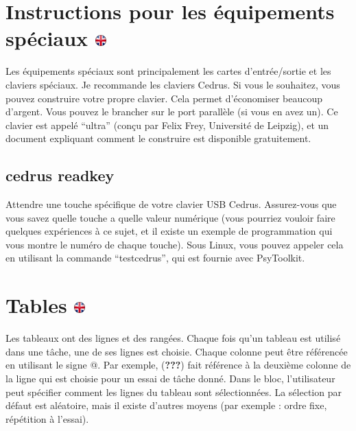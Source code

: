 \documentclass[
]{book}
\begin{document}
\hypertarget{instructions-pour-les-uxe9quipements-spuxe9ciaux}{%
\section[Instructions pour les équipements spéciaux
]{\texorpdfstring{Instructions pour les équipements spéciaux
\href{https://www.psytoolkit.org/doc3.2.0/syntax.html\#_instructions_for_special_equipment}{\protect\includegraphics{img/ukflag.png}}}{Instructions pour les équipements spéciaux }}\label{instructions-pour-les-uxe9quipements-spuxe9ciaux}}

Les équipements spéciaux sont principalement les cartes d'entrée/sortie
et les claviers spéciaux. Je recommande les claviers Cedrus. Si vous le
souhaitez, vous pouvez construire votre propre clavier. Cela permet
d'économiser beaucoup d'argent. Vous pouvez le brancher sur le port
parallèle (si vous en avez un). Ce clavier est appelé ``ultra'' (conçu
par Felix Frey, Université de Leipzig), et un document expliquant
comment le construire est disponible gratuitement.

\hypertarget{cedrusreadkey}{%
\subsection{cedrus readkey}\label{cedrusreadkey}}

Attendre une touche spécifique de votre clavier USB Cedrus. Assurez-vous
que vous savez quelle touche a quelle valeur numérique (vous pourriez
vouloir faire quelques expériences à ce sujet, et il existe un exemple
de programmation qui vous montre le numéro de chaque touche). Sous
Linux, vous pouvez appeler cela en utilisant la commande ``testcedrus'',
qui est fournie avec PsyToolkit.

\hypertarget{tables}{%
\section[Tables ]{\texorpdfstring{Tables
\href{https://www.psytoolkit.org/doc3.2.0/syntax.html\#table}{\protect\includegraphics{img/ukflag.png}}}{Tables }}\label{tables}}

Les tableaux ont des lignes et des rangées. Chaque fois qu'un tableau
est utilisé dans une tâche, une de ses lignes est choisie. Chaque
colonne peut être référencée en utilisant le signe @. Par exemple,
({\textbf{???}}) fait référence à la deuxième colonne de la ligne qui
est choisie pour un essai de tâche donné. Dans le bloc, l'utilisateur
peut spécifier comment les lignes du tableau sont sélectionnées. La
sélection par défaut est aléatoire, mais il existe d'autres moyens (par
exemple : ordre fixe, répétition à l'essai).
\end{document}
